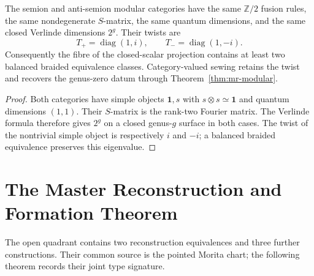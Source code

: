 \begin{proposition}
\label{prop:mr-scalar-fibre-multiplicity}
The semion and anti-semion modular categories have the same
$\mathbb Z/2$ fusion rules, the same nondegenerate $S$-matrix, the
same quantum dimensions, and the same closed Verlinde dimensions
$2^g$.  Their twists are
\[
 T_+=\operatorname{diag}(1,i),
 \qquad
 T_-=\operatorname{diag}(1,-i).
\]
Consequently the fibre of the closed-scalar projection contains at
least two balanced braided equivalence classes.  Category-valued
sewing retains the twist and recovers the genus-zero datum through
Theorem~\ref{thm:mr-modular}.
\end{proposition}

\begin{proof}
Both categories have simple objects $\mathbf1,s$ with
$s\otimes s\simeq\mathbf1$ and quantum dimensions $(1,1)$.  Their
$S$-matrix is the rank-two Fourier matrix.  The Verlinde formula
therefore gives $2^g$ on a closed genus-$g$ surface in both cases.
The twist of the nontrivial simple object is respectively $i$ and
$-i$; a balanced braided equivalence preserves this eigenvalue.
\end{proof}

\section{The Master Reconstruction and Formation Theorem}
\label{sec:mr-master}

The open quadrant contains two reconstruction equivalences and three
further constructions.  Their common source is the pointed Morita chart;
the following theorem records their joint type signature.

